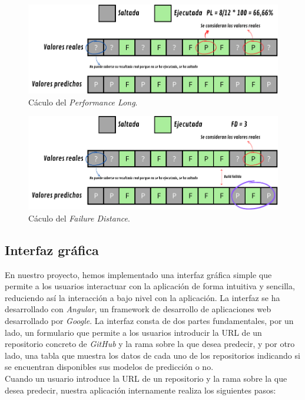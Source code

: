 \begin{figure}[H]
    \centering
    \includegraphics[scale=0.9]{images/PL.pdf}
    \caption{Cáculo del \textit{Performance Long}.}
    \label{fig:PL}
\end{figure}

\begin{figure}[H]
    \centering
    \includegraphics[scale=0.9]{images/FD.pdf}
    \caption{Cáculo del \textit{Failure Distance}.}
    \label{fig:FD}
\end{figure}

\subsection{Interfaz gráfica}
En nuestro proyecto, hemos implementado una interfaz gráfica simple que permite a los usuarios
interactuar con la aplicación de forma intuitiva y sencilla, reduciendo así la interacción a
bajo nivel con la aplicación. La interfaz se ha desarrollado con \textit{Angular}, un framework
de desarrollo de aplicaciones web desarrollado por \textit{Google}. La interfaz consta de dos
partes fundamentales, por un lado, un formulario que permite a los usuarios introducir la URL
de un repositorio concreto de \textit{GitHub} y la rama sobre la que desea predecir, y por otro
lado, una tabla que muestra los datos de cada uno de los repositorios indicando si se encuentran
disponibles sus modelos de predicción o no. \\

Cuando un usuario introduce la URL de un repositorio y la rama sobre la que desea predecir,
nuestra aplicación internamente realiza los siguientes pasos:

